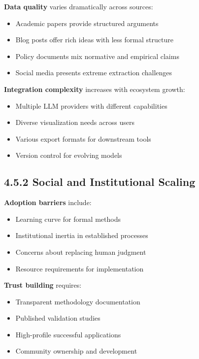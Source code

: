 \documentclass[
  11pt,
  letterpaper,
]{book}
\providecommand{\tightlist}{%
  \setlength{\itemsep}{0pt}\setlength{\parskip}{0pt}}
\begin{document}
\textbf{Data quality} varies dramatically across sources:

\begin{itemize}
\tightlist
\item
  Academic papers provide structured arguments
\item
  Blog posts offer rich ideas with less formal structure
\item
  Policy documents mix normative and empirical claims
\item
  Social media presents extreme extraction challenges
\end{itemize}

\textbf{Integration complexity} increases with ecosystem growth:

\begin{itemize}
\tightlist
\item
  Multiple LLM providers with different capabilities
\item
  Diverse visualization needs across users
\item
  Various export formats for downstream tools
\item
  Version control for evolving models
\end{itemize}

\subsection{4.5.2 Social and Institutional
Scaling}\label{sec-social-scaling}

\textbf{Adoption barriers} include:

\begin{itemize}
\tightlist
\item
  Learning curve for formal methods
\item
  Institutional inertia in established processes
\item
  Concerns about replacing human judgment
\item
  Resource requirements for implementation
\end{itemize}

\textbf{Trust building} requires:

\begin{itemize}
\tightlist
\item
  Transparent methodology documentation
\item
  Published validation studies
\item
  High-profile successful applications
\item
  Community ownership and development
\end{itemize}
\end{document}
